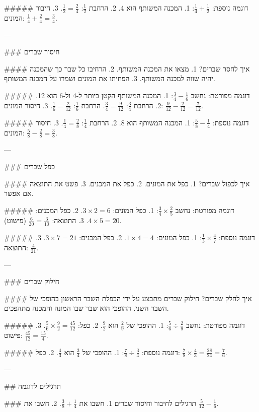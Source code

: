 ##### דוגמה נוספת:
$\frac{1}{4} + \frac{1}{2}$:
1. המכנה המשותף הוא 4.
2. הרחבת $\frac{1}{2}$: $\frac{1}{2} = \frac{2}{4}$.
3. חיבור המונים: $\frac{1}{4} + \frac{2}{4} = \frac{3}{4}$.

---

### חיסור שברים

#### איך לחסר שברים?
1. מצאו את המכנה המשותף.
2. הרחיבו כל שבר כך שהמכנה יהיה שווה למכנה המשותף.
3. הפחיתו את המונים ושמרו על המכנה המשותף.

##### דוגמה מפורטת:
נחשב $\frac{3}{4} - \frac{1}{6}$:
1. המכנה המשותף הקטן ביותר ל-4 ול-6 הוא 12.
2. הרחבת $\frac{3}{4}$: $\frac{3}{4} = \frac{9}{12}$.
   הרחבת $\frac{1}{6}$: $\frac{1}{6} = \frac{2}{12}$.
3. חיסור המונים: $\frac{9}{12} - \frac{2}{12} = \frac{7}{12}$.

##### דוגמה נוספת:
$\frac{5}{8} - \frac{1}{4}$:
1. המכנה המשותף הוא 8.
2. הרחבת $\frac{1}{4}$: $\frac{1}{4} = \frac{2}{8}$.
3. חיסור המונים: $\frac{5}{8} - \frac{2}{8} = \frac{3}{8}$.

---

### כפל שברים

#### איך לכפול שברים?
1. כפל את המונים.
2. כפל את המכנים.
3. פשט את התוצאה אם אפשר.

##### דוגמה מפורטת:
נחשב $\frac{3}{4} \times \frac{2}{5}$:
1. כפל המונים: $3 \times 2 = 6$.
2. כפל המכנים: $4 \times 5 = 20$.
3. התוצאה: $\frac{6}{20} = \frac{3}{10}$ (פישוט).

##### דוגמה נוספת:
$\frac{1}{3} \times \frac{4}{7}$:
1. כפל המונים: $1 \times 4 = 4$.
2. כפל המכנים: $3 \times 7 = 21$.
3. התוצאה: $\frac{4}{21}$.

---

### חילוק שברים

#### איך לחלק שברים?
חילוק שברים מתבצע על ידי הכפלת השבר הראשון בהופכי של השבר השני. ההופכי הוא שבר שבו המונה והמכנה מתהפכים.

##### דוגמה מפורטת:
נחשב $\frac{5}{6} \div \frac{2}{9}$:
1. ההופכי של $\frac{2}{9}$ הוא $\frac{9}{2}$.
2. כפל: $\frac{5}{6} \times \frac{9}{2} = \frac{45}{12}$.
3. פישוט: $\frac{45}{12} = \frac{15}{4}$.

##### דוגמה נוספת:
$\frac{7}{8} \div \frac{3}{4}$:
1. ההופכי של $\frac{3}{4}$ הוא $\frac{4}{3}$.
2. כפל: $\frac{7}{8} \times \frac{4}{3} = \frac{28}{24} = \frac{7}{6}$.

---

## תרגילים לדוגמה

### תרגילים לחיבור וחיסור שברים
1. חשבו את $\frac{3}{8} + \frac{1}{4}$.
2. חשבו את $\frac{5}{12} - \frac{1}{6}$.

